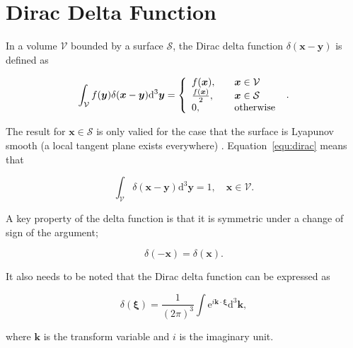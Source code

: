 \documentclass[12pt]{article}
\begin{document}
\section{Dirac Delta Function}
\label{app:delta}

In a volume $\mathcal{V}$ bounded by a surface $\mathcal{S}$, the Dirac delta function $\delta(\boldsymbol{x} - \boldsymbol{y})$ is defined as \citep{Riley06}

\begin{equation}
\label{equ:dirac}
\int_{\mathcal{V}} f(\boldsymbol{y}) \delta(\boldsymbol{x} - \boldsymbol{y}) \mathrm{d}^{3} \boldsymbol{y} = \left\{
    \begin{array}{l l}
      f(\boldsymbol{x}), &\quad \boldsymbol{x} \in \mathcal{V} \\
      \frac{f(\boldsymbol{x})}{2}, &\quad \boldsymbol{x} \in \mathcal{S} \\
      0, & \quad \text{otherwise}
\end{array}
\right.\ .
\end{equation}

The result for $\boldsymbol{x} \in \mathcal{S}$ is only valied for the case that the surface is Lyapunov smooth (a local tangent plane exists everywhere) \citep{Gunter67}. Equation~\ref{equ:dirac} means that

\begin{equation}
\label{equ:delta_int}
\int_{\mathcal{V}} \delta(\boldsymbol{x} - \boldsymbol{y}) \mathrm{d}^{3} \boldsymbol{y} = 1, \quad \boldsymbol{x} \in \mathcal{V}.
\end{equation}

A key property of the delta function is that it is symmetric under a change of sign of the argument;

\begin{equation}
\label{equ:delta_sym}
\delta(-\boldsymbol{x}) = \delta(\boldsymbol{x}).
\end{equation}

It also needs to be noted that the Dirac delta function can be expressed as \citep{Riley06}

\begin{equation}
\label{equ:delta_int_def}
\delta (\boldsymbol{\xi}) = \frac{1}{(2 \pi)^{3}} \int \mathrm{e}^{i \boldsymbol{k} \cdot \boldsymbol{\xi}} \mathrm{d}^{3} \boldsymbol{k},
\end{equation}

where $\boldsymbol{k}$ is the transform variable and $i$ is the imaginary unit.
\end{document}
